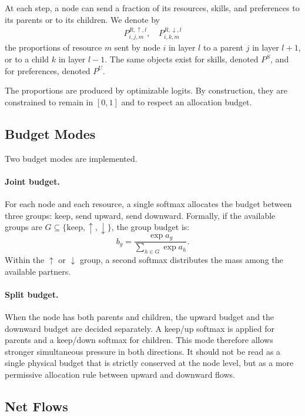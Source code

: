 \documentclass[11pt]{article}
\begin{document}
At each step, a node can send a fraction of its resources, skills, and preferences to its parents or to its children. We denote by
\begin{align}
    P^{R,\uparrow,l}_{i,j,m}, \quad P^{R,\downarrow,l}_{i,k,m}
\end{align}
the proportions of resource $m$ sent by node $i$ in layer $l$ to a parent $j$ in layer $l+1$, or to a child $k$ in layer $l-1$. The same objects exist for skills, denoted $P^S$, and for preferences, denoted $P^U$.

The proportions are produced by optimizable logits. By construction, they are constrained to remain in $[0,1]$ and to respect an allocation budget.

\subsection{Budget Modes}

Two budget modes are implemented.

\paragraph{Joint budget.}
For each node and each resource, a single softmax allocates the budget between three groups: keep, send upward, send downward. Formally, if the available groups are $G \subseteq \{\mathrm{keep},\uparrow,\downarrow\}$, the group budget is:
\begin{equation}
    b_g = \frac{\exp a_g}{\sum_{h \in G} \exp a_h}.
\end{equation}
Within the $\uparrow$ or $\downarrow$ group, a second softmax distributes the mass among the available partners.

\paragraph{Split budget.}
When the node has both parents and children, the upward budget and the downward budget are decided separately. A keep/up softmax is applied for parents and a keep/down softmax for children. This mode therefore allows stronger simultaneous pressure in both directions.
It should not be read as a single physical budget that is strictly conserved at the node level, but as a more permissive allocation rule between upward and downward flows.

\subsection{Net Flows}
\end{document}
